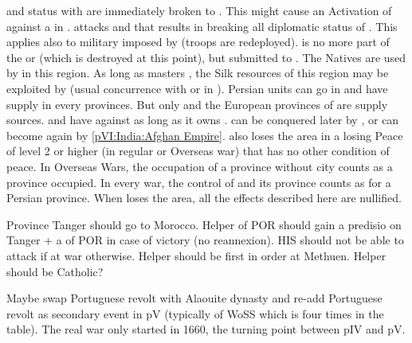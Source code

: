 \phevnt
{}\label{pIV:Persian Safavids:Fall Ormus} \dipAT and
\dipFR status with \paysOrmus are immediately broken to \dipNR. This might
cause an Activation of \paysperse against a \TP in \paysOrmus.
 \paysperse attacks \paysOman and that results in
breaking all diplomatic status of \paysOman. This applies also to military
\dipAT imposed by \PORmin (troops are redeployed).
\bparag {} is no more part of the \paysMogol or
\paysAfghans (which is destroyed at this point), but submitted to
\paysperse. The Natives are used by \paysperse in this region.
\bparag As long as \paysPerse masters , the Silk
resources of this region may be exploited by \provinceOrmus (usual concurrence
with \TP or \COL in ).
\bparag Persian units can go in  and have supply in
every provinces. But only \villeHerat and the European provinces of \paysperse
are supply sources.
\bparag \RUS and \TUR have \OCB against \paysperse as long as it owns
.
\bparag {} can be conquered later by \paysMogol, or
can become \paysAfghans again by \ref{pVI:India:Afghan Empire}.
\bparag \paysperse also loses the area in a losing Peace of level 2 or higher
(in regular or Overseas war) that has no other condition of peace. In Overseas
Wars, the occupation of a province without city counts as a province
occupied. In every war, the control of \villeHerat and its province counts as
for a Persian province.
\bparag When \paysperse loses the area, all the effects described here are
nullified.




\begin{todo}
  Province Tanger should go to Morocco. Helper of POR should gain a predisio
  on Tanger + a \TP of POR in case of victory (no reannexion). HIS should not
  be able to attack if at war otherwise. Helper should be first in order at
  Methuen. Helper should be Catholic?

  Maybe swap Portuguese revolt with Alaouite dynasty and re-add Portuguese
  revolt as secondary event in pV (typically of WoSS which is four times in
  the table). The real war only started in 1660, the turning point between pIV
  and pV.
\end{todo}

